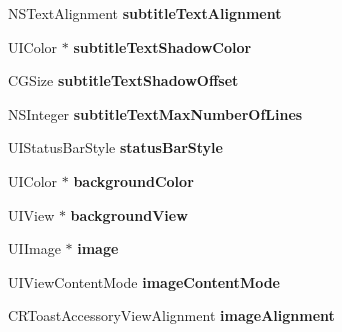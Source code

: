 \begin{DoxyCompactItemize}
\item 
\hypertarget{interface_c_r_toast_a030ee8870f0b380779912f812d227b27}{}N\+S\+Text\+Alignment {\bfseries subtitle\+Text\+Alignment}\label{interface_c_r_toast_a030ee8870f0b380779912f812d227b27}

\item 
\hypertarget{interface_c_r_toast_a2c7cdc8bf358ed8bc792ac08e16304dc}{}U\+I\+Color $\ast$ {\bfseries subtitle\+Text\+Shadow\+Color}\label{interface_c_r_toast_a2c7cdc8bf358ed8bc792ac08e16304dc}

\item 
\hypertarget{interface_c_r_toast_abfae3c4ab8a232c377197a3314f5f64f}{}C\+G\+Size {\bfseries subtitle\+Text\+Shadow\+Offset}\label{interface_c_r_toast_abfae3c4ab8a232c377197a3314f5f64f}

\item 
\hypertarget{interface_c_r_toast_a9e49f29269b9e7ed0f743456d3a4f640}{}N\+S\+Integer {\bfseries subtitle\+Text\+Max\+Number\+Of\+Lines}\label{interface_c_r_toast_a9e49f29269b9e7ed0f743456d3a4f640}

\item 
\hypertarget{interface_c_r_toast_ad6a055f096ae0167a23839d749ec8068}{}U\+I\+Status\+Bar\+Style {\bfseries status\+Bar\+Style}\label{interface_c_r_toast_ad6a055f096ae0167a23839d749ec8068}

\item 
\hypertarget{interface_c_r_toast_ac7696cf2a54d6672ee62f5b15cda42d9}{}U\+I\+Color $\ast$ {\bfseries background\+Color}\label{interface_c_r_toast_ac7696cf2a54d6672ee62f5b15cda42d9}

\item 
\hypertarget{interface_c_r_toast_ad5c6d6b444a636690cf562d6e2c4ad82}{}U\+I\+View $\ast$ {\bfseries background\+View}\label{interface_c_r_toast_ad5c6d6b444a636690cf562d6e2c4ad82}

\item 
\hypertarget{interface_c_r_toast_af0d9a5c85646fd756ee83e1958935c8d}{}U\+I\+Image $\ast$ {\bfseries image}\label{interface_c_r_toast_af0d9a5c85646fd756ee83e1958935c8d}

\item 
\hypertarget{interface_c_r_toast_aabc57f1bbee8547b0baa840f4dd0a37b}{}U\+I\+View\+Content\+Mode {\bfseries image\+Content\+Mode}\label{interface_c_r_toast_aabc57f1bbee8547b0baa840f4dd0a37b}

\item 
\hypertarget{interface_c_r_toast_a639599cfa54c9447ecb62ad28866600b}{}C\+R\+Toast\+Accessory\+View\+Alignment {\bfseries image\+Alignment}\label{interface_c_r_toast_a639599cfa54c9447ecb62ad28866600b}


\end{DoxyCompactItemize}
